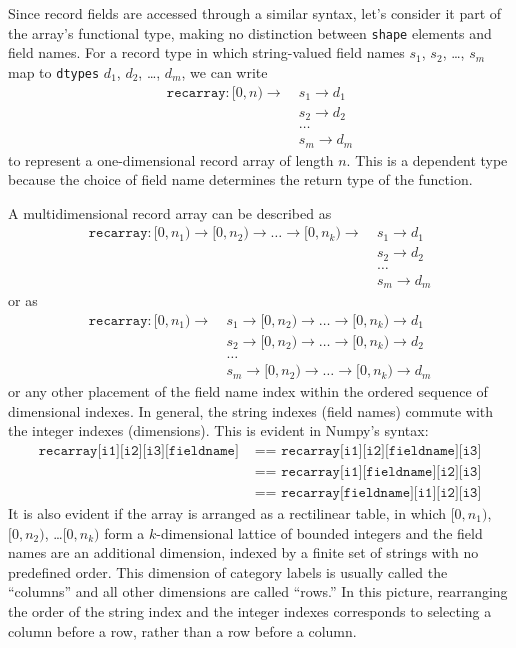 \documentclass[12pt]{article}
\begin{document}
Since record fields are accessed through a similar syntax, let's consider it part of the array's functional type, making no distinction between \texttt{shape} elements and field names. For a record type in which string-valued field names $s_1$, $s_2$, \ldots, $s_m$ map to \texttt{dtypes} $d_1$, $d_2$, \ldots, $d_m$, we can write
\begin{align*}
\texttt{recarray}: [0, n) \to &\ s_1 \to d_1 \\
 &\ s_2 \to d_2 \\
 &\ \ldots \\
 &\ s_m \to d_m
\end{align*}
\noindent to represent a one-dimensional record array of length $n$. This is a dependent type because the choice of field name determines the return type of the function.

A multidimensional record array can be described as
\begin{align*}
\texttt{recarray}: [0, n_1) \to [0, n_2) \to \ldots \to [0, n_k) \to &\ s_1 \to d_1 \\
 &\ s_2 \to d_2 \\
 &\ \ldots \\
 &\ s_m \to d_m
\end{align*}
\noindent or as
\begin{align*}
\texttt{recarray}: [0, n_1) \to &\ s_1 \to [0, n_2) \to \ldots \to [0, n_k) \to d_1 \\
 &\ s_2 \to [0, n_2) \to \ldots \to [0, n_k) \to d_2 \\
 &\ \ldots \\
 &\ s_m \to [0, n_2) \to \ldots \to [0, n_k) \to d_m
\end{align*}
\noindent or any other placement of the field name index within the ordered sequence of dimensional indexes. In general, the string indexes (field names) commute with the integer indexes (dimensions). This is evident in Numpy's syntax:
\begin{align*}
\texttt{recarray[i1][i2][i3][fieldname]} & \texttt{ == recarray[i1][i2][fieldname][i3]} \\
 & \texttt{ == recarray[i1][fieldname][i2][i3]} \\
 & \texttt{ == recarray[fieldname][i1][i2][i3]}
\end{align*}
\noindent It is also evident if the array is arranged as a rectilinear table, in which $[0, n_1)$, $[0, n_2)$, \ldots $[0, n_k)$ form a $k$-dimensional lattice of bounded integers and the field names are an additional dimension, indexed by a finite set of strings with no predefined order. This dimension of category labels is usually called the ``columns'' and all other dimensions are called ``rows.'' In this picture, rearranging the order of the string index and the integer indexes corresponds to selecting a column before a row, rather than a row before a column.
\end{document}
